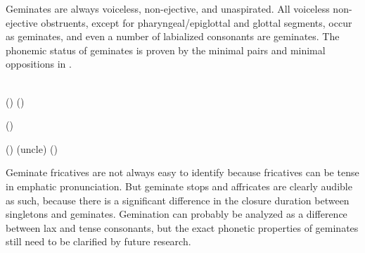 Geminates are always voiceless, non-ejective, and unaspirated. All voiceless non-ejective obstruents, except for pharyngeal/epiglottal and glottal segments, occur as geminates, and even a number of labialized consonants are geminates. The phonemic status of geminates is proven by the minimal pairs and minimal oppositions in .
%
\begin{exe}
	\ex	\label{ex:gemination B phon@A}
	\begin{xlist}
\TabPositions{14em}
		\ex	{} 	\tab {} 	\\
		()
		\ex	{} ()  \tab {} 	\label{ex:buqij phon}
	
		\ex	{} 	\tab {}  \label{ex:busij phon}
		
		\ex	{} ()  \tab {}  	\label{ex:bacij phonA}
		
		\ex	{} ()  \tab {}  (uncle)	\label{ex:bacij phonB}
		\ex	{}  () \tab {} 	\label{ex:hetij phonC}
		
	\end{xlist}
\end{exe}

Geminate fricatives are not always easy to identify because fricatives can be tense in emphatic pronunciation. But geminate stops and affricates are clearly audible as such, because there is a significant difference in the closure duration between singletons and geminates. Gemination can probably be analyzed as a difference between lax and tense consonants, but the exact phonetic properties of geminates still need to be clarified by future research.

